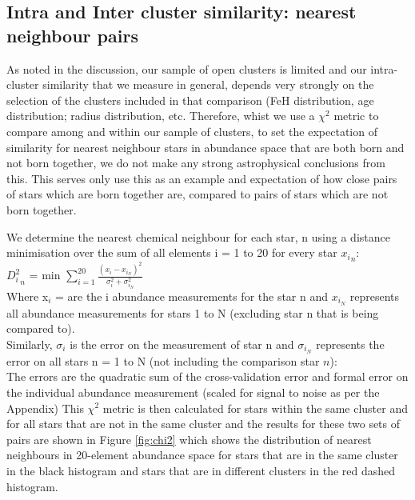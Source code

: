\documentclass[14pt, preprint2]{aastex6}
\begin{document}
\subsection{Intra and Inter cluster similarity: nearest neighbour pairs}

As noted in the discussion,  our sample of open clusters is limited and our intra-cluster similarity that we measure in general, depends very strongly on the selection of the clusters included in that comparison (FeH distribution, age distribution; radius distribution, etc. Therefore, whist we use a $\chi^2$ metric to compare among and within our sample of clusters, to set the expectation of similarity for nearest neighbour stars in abundance space that are both born and not born together, we do not make any  strong astrophysical conclusions from this. This serves only use this as an example and expectation of how close pairs of stars which are born together are, compared to pairs of stars which are not born together.  

We determine the nearest chemical neighbour for each star, n using a distance minimisation over the sum of all elements i = 1 to 20 for every star ${x_i}_n$: \\

${D_i^2}_n$ = min $ \sum_{i=1}^{20}  \frac{(x_i - x_{i_N})^2}{\sigma_i^2 + \sigma_{i_N}^2}$  \\

Where x$_i$ = are the i abundance measurements for the star n and  $x_{i_N}$ represents all abundance measurements for stars 1 to N (excluding star n that is being compared to). \\
Similarly, $\sigma_i$ is the error on the measurement of star n and $\sigma_{i_N}$ represents the error on all stars n = 1 to N (not including the comparison star $n$): \\
The errors are the quadratic sum of the cross-validation error and formal error on the individual abundance measurement (scaled for signal to noise as per the Appendix) 
This $\chi^2$ metric is then calculated for stars within the same cluster and for all stars that are not in the same cluster and the results for these two sets of pairs are shown in Figure \ref{fig:chi2} which shows the distribution of nearest neighbours in 20-element abundance space for stars that are in the same cluster in the black histogram and stars that are in different clusters in the red dashed histogram. 
\end{document}
